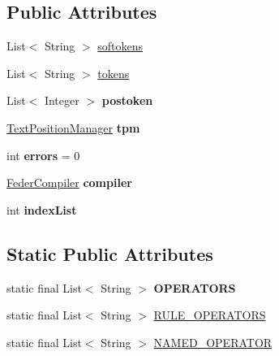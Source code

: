 \subsection*{Public Attributes}
\begin{DoxyCompactItemize}
\item 
List$<$ String $>$ \hyperlink{classfeder_1_1Lexer_a8dcd49cd409b92ea88d9e5e4ac312bee}{softokens}
\item 
List$<$ String $>$ \hyperlink{classfeder_1_1Lexer_a2ed05abcd7fc74ad17e99bd3795d289b}{tokens}
\item 
\mbox{\label{classfeder_1_1Lexer_a43d6e1225cc8d3618ba0b5c92953c679}} 
List$<$ Integer $>$ {\bfseries postoken}
\item 
\mbox{\label{classfeder_1_1Lexer_aae364370e5ed7814b3e77bd815f440b6}} 
\hyperlink{classfeder_1_1utils_1_1TextPositionManager}{Text\+Position\+Manager} {\bfseries tpm}
\item 
\mbox{\label{classfeder_1_1Lexer_a6cb55f752e7dd2e18b9350d5bc1aaf00}} 
int {\bfseries errors} = 0
\item 
\mbox{\label{classfeder_1_1Lexer_a02a6da779c8fb2ddd943ac1ad49352f6}} 
\hyperlink{classfeder_1_1FederCompiler}{Feder\+Compiler} {\bfseries compiler}
\item 
\mbox{\label{classfeder_1_1Lexer_ab1555a16a3bb67ce086febe81f7c5ba3}} 
int {\bfseries index\+List}
\end{DoxyCompactItemize}
\subsection*{Static Public Attributes}
\begin{DoxyCompactItemize}
\item 
static final List$<$ String $>$ {\bfseries O\+P\+E\+R\+A\+T\+O\+RS}
\item 
static final List$<$ String $>$ \hyperlink{classfeder_1_1Lexer_a9b040bc2158eeda1a1f579a41bedaa92}{R\+U\+L\+E\+\_\+\+O\+P\+E\+R\+A\+T\+O\+RS}
\item 
static final List$<$ String $>$ \hyperlink{classfeder_1_1Lexer_a0e0ebb5336f19210156b0cb6e146c2b3}{N\+A\+M\+E\+D\+\_\+\+O\+P\+E\+R\+A\+T\+OR}
\end{DoxyCompactItemize}


